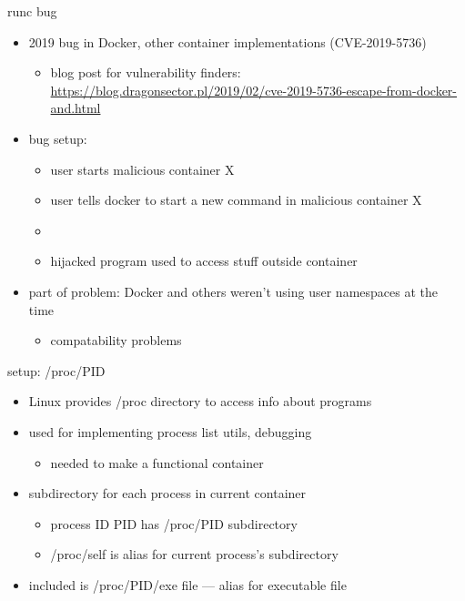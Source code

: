 \begin{frame}{runc bug}
    \begin{itemize}
    \item 2019 bug in Docker, other container implementations (CVE-2019-5736)
        \begin{itemize}
        \item blog post for vulnerability finders: \\\scriptsize \url{https://blog.dragonsector.pl/2019/02/cve-2019-5736-escape-from-docker-and.html}
        \end{itemize}
    \vspace{.5cm}
    \item bug setup:
        \begin{itemize}
        \item user starts malicious container X
        \item user tells docker to start a new command in malicious container X
        \item {}
        \item hijacked program used to access stuff outside container
        \end{itemize}
    \item part of problem: Docker and others weren't using user namespaces at the time
        \begin{itemize}
        \item compatability problems
        \end{itemize}
    \end{itemize}
\end{frame}

\begin{frame}{setup: /proc/PID}
    \begin{itemize}
    \item Linux provides /proc directory to access info about programs
    \item used for implementing process list utils, debugging
        \begin{itemize}
        \item needed to make a functional container
        \end{itemize}
    \item subdirectory for each process in current container
        \begin{itemize}
        \item process ID PID has /proc/PID subdirectory
        \item /proc/self is alias for current process's subdirectory
        \end{itemize}
    \vspace{.5cm}
    \item included is /proc/PID/exe file --- alias for executable file
    \end{itemize}
\end{frame}

